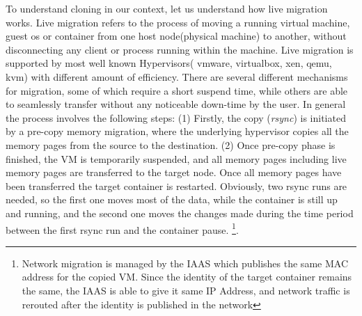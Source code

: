 To understand cloning in our context, let us understand how live migration works. 
Live migration refers to the process of moving a running virtual machine, guest os or container from one host node(physical machine) to another, without disconnecting any client or process running within the machine. 
Live migration is supported by most well known Hypervisors( vmware, virtualbox, xen, qemu, kvm) with different amount of efficiency.
There are several different mechanisms for migration, some of which require a short suspend time, while others are able to seamlessly transfer without any noticeable down-time by the user.
In general the process involves the following steps: 
(1) Firstly, the copy (\textit{rsync}) is initiated by a pre-copy memory migration, where the underlying hypervisor copies all the memory pages from the source to the destination. 
(2) Once pre-copy phase is finished, the VM is temporarily suspended, and all memory pages including live memory pages are transferred to the target node. 
Once all memory pages have been transferred the target container is restarted. 
Obviously, two rsync runs are needed, so the first one moves most of the data, while the container is still up and running, and the second one moves the changes made during the time period between the first rsync run and the container pause.
\footnote{Network migration is managed by the IAAS which publishes the same MAC address for the copied VM. 
Since the identity of the target container remains the same, the IAAS is able to give it same IP Address, and network traffic is rerouted after the identity is published in the network}.

